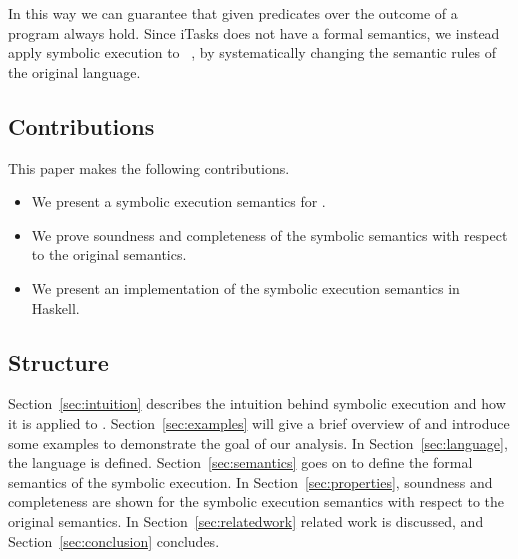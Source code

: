 In this way we can guarantee that given predicates over the outcome of a \TOP program always hold.
Since iTasks does not have a formal semantics, we instead apply symbolic execution to \TOPHAT~\cite{Steenvoorden2019}, by systematically changing the semantic rules of the original language.



\subsection{Contributions}

This paper makes the following contributions.

\begin{itemize}
  \item We present a symbolic execution semantics for \TOPHAT.
  \item We prove soundness and completeness of the symbolic semantics with respect to the original \TOPHAT semantics.
  \item We present an implementation of the symbolic execution semantics in Haskell.
\end{itemize}



\subsection{Structure}

Section~\ref{sec:intuition} describes the intuition behind symbolic execution and how it is applied to \TOPHAT.
Section~\ref{sec:examples} will give a brief overview of \TOPHAT and introduce some examples to demonstrate the goal of our analysis.
In Section~\ref{sec:language}, the \TOPHAT language is defined.
Section~\ref{sec:semantics} goes on to define the formal semantics of the symbolic execution.
In Section~\ref{sec:properties}, soundness and completeness are shown for the symbolic execution semantics with respect to the original \TOPHAT semantics.
In Section~\ref{sec:relatedwork} related work is discussed, and Section~\ref{sec:conclusion} concludes.
